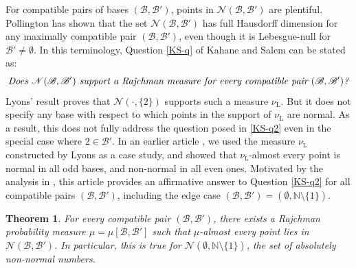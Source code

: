 \documentclass[12pt, twoside]{article}
\newtheorem{theorem}{Theorem}[section]
\theoremstyle{definition}
\numberwithin{equation}{section}
\begin{document}
\vskip0.12in
\noindent For compatible pairs of bases $(\mathscr{B}, \mathscr{B}')$, points in $\mathscr N(\mathscr{B}, \mathscr{B}')$ are plentiful. Pollington \cite{p81} has shown that  the set $\mathscr N(\mathscr{B}, \mathscr{B}')$ has full Hausdorff dimension for any maximally compatible pair $(\mathscr{B}, \mathscr{B}')$, even though it is Lebesgue-null for $\mathscr{B}' \neq \emptyset$.  In this terminology, Question \eqref{KS-q} of Kahane and Salem \cite{Kahane-Salem-64} can be stated as: \begin{equation} \label{KS-q2}
{\text{\em{Does $\mathscr N(\mathscr{B}, \mathscr{B}')$ support a Rajchman measure for every compatible pair $(\mathscr{B}, \mathscr{B}')$?}}} 
\end{equation} 
Lyons' result \cite{l86} proves that $\mathscr{N}(\cdot, \{2\})$ supports such a measure $\nu_{\text{L}}$. But it does not specify any base with respect to which points in the support of $\nu_{\text{L}}$ are normal. As a result, this does not fully address the question posed in \eqref{KS-q2} even in the special case where $2 \in \mathscr{B}'$. In an earlier article \cite{PZ-1}, we used the measure $\nu_{\mathtt L}$ constructed by Lyons as a case study, and showed that $\nu_{\mathtt L}$-almost every point is normal in all odd bases, and non-normal in all even ones. Motivated by the analysis in \cite{PZ-1}, this article provides an affirmative answer to Question \eqref{KS-q2} for all compatible pairs $(\mathscr{B}, \mathscr{B}')$, including the edge case $(\mathscr{B}, \mathscr{B}') = (\emptyset, \mathbb N \setminus \{1\})$. 
\begin{theorem} \label{mainthm-1} 
For every compatible pair $(\mathscr{B}, \mathscr{B}')$, there exists a Rajchman probability measure $\mu = \mu[\mathscr{B}, \mathscr{B}']$ such that $\mu$-almost every point lies in $\mathscr N(\mathscr{B}, \mathscr{B}')$. In particular, this is true for $\mathscr N(\emptyset, \mathbb N \setminus \{1\})$, the set of absolutely non-normal numbers.  
\end{theorem} 
\end{document}
